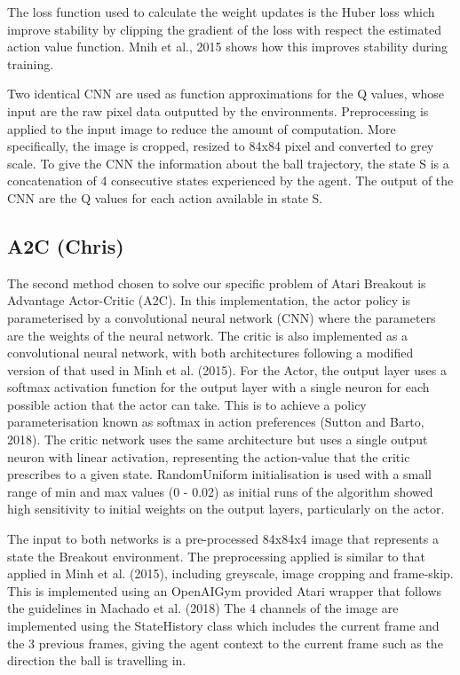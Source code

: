 \documentclass{article}
\begin{document}
The loss function used to calculate the weight updates is the Huber loss which improve stability by clipping the gradient of the loss with respect the estimated action value function. Mnih et al., 2015 shows how this improves stability during training.

Two identical CNN are used as function approximations for the Q values, whose input are the raw pixel data outputted by the environments. Preprocessing is applied to the input image to reduce the amount of computation. More specifically, the image is cropped, resized to 84x84 pixel and converted to grey scale. To give the CNN the information about the ball trajectory, the state S is a concatenation of 4 consecutive states experienced by the agent. The output of the CNN are the Q values for each action available in state S.

\subsection{A2C (Chris)}

The second method chosen to solve our specific problem of Atari Breakout is Advantage Actor-Critic (A2C). In this implementation, the actor policy is parameterised by a convolutional neural network (CNN) where the parameters are the weights of the neural network. The critic is also implemented as a convolutional neural network, with both architectures following a modified version of that used in Minh et al. (2015). For the Actor, the output layer uses a softmax activation function for the output layer with a single neuron for each possible action that the actor can take. This is to achieve a policy parameterisation known as softmax in action preferences (Sutton and Barto, 2018). The critic network uses the same architecture but uses a single output neuron with linear activation, representing the action-value that the critic prescribes to a given state. RandomUniform initialisation is used with a small range of min and max values (0 - 0.02) as initial runs of the algorithm showed high sensitivity to initial weights on the output layers, particularly on the actor.

The input to both networks is a pre-processed 84x84x4 image that represents a state the Breakout environment. The preprocessing applied is similar to that applied in Minh et al. (2015), including greyscale, image cropping and frame-skip. This is implemented using an OpenAIGym provided Atari wrapper that follows the guidelines in Machado et al. (2018) The 4 channels of the image are implemented using the StateHistory class which includes the current frame and the 3 previous frames, giving the agent context to the current frame such as the direction the ball is travelling in.
\end{document}
